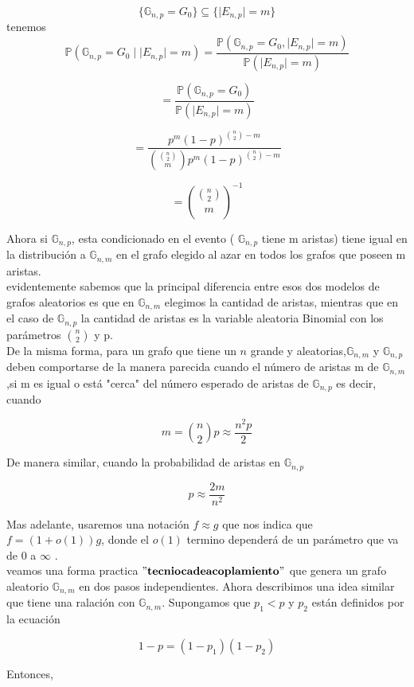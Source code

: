 \documentclass[11pt,a4paper]{article}
\begin{document}
 $$\lbrace\mathbb{G}_{n,p}=G_0\rbrace \subseteq \lbrace\mid E_{n,p}\mid = m\rbrace$$
 tenemos\\
 
 $$\mathbb{P}(\mathbb{G}_{n,p}= G_0\mid\mid E_{n,p}\mid =m)=\frac{\mathbb{P}(\mathbb{G}_{n,p}= G_0,\mid E_{n,p}\mid =m)}{\mathbb{P}(\mid E_{n,p}\mid =m)} $$
 
  $$=\frac{\mathbb{P}(\mathbb{G}_{n,p}= G_0)}{\mathbb{P}(\mid E_{n,p}\mid =m)}$$

$$=\frac{p^m(1-p)^{\binom {n}{2}-m}}{\binom {\binom {n}{2}}{m}p^m(1-p)^{\binom {n}{2}-m} } $$

$$=\binom {\binom{n}{2}}{m}^{-1}$$

Ahora si $\mathbb{G}_{n,p}$, esta condicionado en el evento ( $\mathbb{G}_{n,p}$ tiene m aristas) tiene igual en la distribuci\'on a $\mathbb{G}_{n,m}$ en el grafo elegido al azar en todos los grafos que poseen m aristas.\\
evidentemente sabemos que la principal diferencia entre esos dos modelos de grafos aleatorios es que en $\mathbb{G}_{n,m}$ elegimos la cantidad de aristas, mientras que en el caso de $\mathbb{G}_{n,p}$ la cantidad de aristas es la variable aleatoria Binomial con los par\'ametros $\binom{n}{2}$ y p.\\

De la misma forma, para un grafo que tiene un $n$ grande y aleatorias,$\mathbb{G}_{n,m}$ y 
$\mathbb{G}_{n,p}$  deben comportarse de la manera parecida cuando el n\'umero de aristas m de $\mathbb{G}_{n,m}$,si m es igual o est\'a "cerca" del n\'umero esperado de aristas de $\mathbb{G}_{n,p}$ es decir, cuando


$$ m =\binom{n}{2} p \approx \frac{n^2p}{2}$$

De manera similar, cuando la probabilidad de aristas en $\mathbb{G}_{n,p}$

 $$p \approx \frac{2m}{n^2}$$

Mas adelante, usaremos una notaci\'on $f \approx g$ que nos indica que $f=(1+ o(1))g$, donde el $o(1)$ termino depender\'a de un par\'ametro que va de 0 a $\infty$ .\\
veamos una forma practica $"{\bf tecnioca de acoplamiento}"$  que genera un grafo aleatorio $\mathbb{G}_{n,m}$ en dos pasos independientes. Ahora describimos una idea similar que tiene una  ralaci\'on con $\mathbb{G}_{n,m}$.
Supongamos que $p_1 <p$ y $p_2$ est\'an  definidos por la ecuaci\'on 

  $$1-p =(1-p_1)(1-p_2)$$ 

Entonces,
\end{document}
